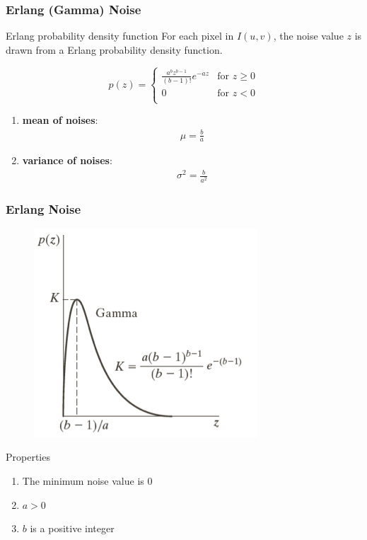 \documentclass[english,11pt,table,handout]{beamer}
\begin{document}
\frame
{
	\frametitle{Erlang (Gamma) Noise}
	\begin{block}{Erlang probability density function}
		For each pixel in $I(u,v)$, the noise value $z$ is drawn from a Erlang probability density function.
		
		$$
		p(z) =
		\begin{cases}
			\frac{a^{b}z^{b-1}}{(b-1)!} e^{-az}& \text{for } z \ge 0\\
			0 & \text{for } z < 0\\
		\end{cases}
		$$
		
		\begin{enumerate}
			\item \alert{\textbf{mean of noises}}: 
			\begin{align}
			\nonumber
			\mu = \frac{b}{a}
			\end{align}
			\item \alert{\textbf{variance of noises}}:
			\begin{align}
			\nonumber
			\sigma^2 = \frac{b}{a^2}
			\end{align}
		\end{enumerate}
		
	\end{block}
	
}
\frame
{
	\frametitle{Erlang Noise}
	\begin{figure}[!h]
		\includegraphics[scale=1.0]{erlang_1d.png}
	\end{figure}
	
	\begin{alertblock}{Properties}
		\begin{enumerate}
			\item The minimum noise value is $0$
			\item $a > 0$
			\item $b$ is a positive integer
		\end{enumerate}
	\end{alertblock}
}
\end{document}

